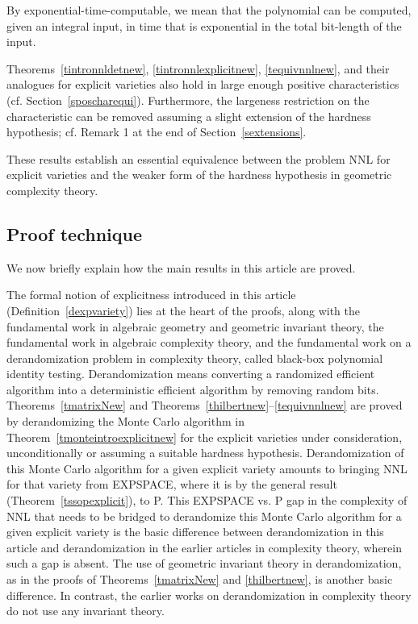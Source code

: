 \documentclass[11pt]{article}
\begin{document}
By exponential-time-computable, we mean that  the  polynomial can be computed, given an integral input, in
time  that is exponential in the total bit-length of the  input. 

Theorems~\ref{tintronnldetnew}, \ref{tintronnlexplicitnew},  \ref{tequivnnlnew}, and their analogues for
explicit varieties also  hold in large enough  positive characteristics (cf. Section~\ref{sposcharequi}). Furthermore, the largeness restriction on
the characteristic can be removed assuming a slight
extension of the hardness hypothesis; cf. Remark 1 at the end of Section~\ref{sextensions}.

These results establish an essential equivalence between
the problem NNL for explicit varieties and 
the weaker form of the hardness hypothesis \cite{GCT1} 
in geometric complexity
theory. 

\subsection{Proof technique} \label{sprooftech}
We now briefly explain how the main results in this article  are proved.

The formal notion of explicitness introduced in this article (Definition~\ref{dexpvariety}) lies 
at the heart of  the proofs, along with the fundamental work  
\cite{hilbert,mumford,popov,derksen,procesimatrix,razmyslov,formanek1,raghavan}
in algebraic geometry 
and geometric invariant theory, the fundamental work \cite{valiant2,skyum,strassen,kaltofen,kaltofenlec,kaltofen2,malod} in
algebraic complexity theory, and the fundamental work \cite{schnorr,nisan,impa,russell,amir,manindra,fs2,fs1}
on a   derandomization problem in complexity theory, called black-box polynomial identity testing.
Derandomization  means converting a randomized efficient
algorithm into a deterministic  efficient algorithm by removing random bits. 
Theorems~\ref{tmatrixNew} and Theorems~\ref{thilbertnew}--\ref{tequivnnlnew} are proved by derandomizing the 
Monte Carlo algorithm in Theorem~\ref{tmonteintroexplicitnew} for the explicit varieties under consideration,
unconditionally or assuming a suitable hardness hypothesis.
Derandomization of this Monte Carlo algorithm for a given explicit variety 
amounts to  bringing NNL for that variety from EXPSPACE, where it is 
by the general result (Theorem~\ref{tssopexplicit}), to P. 
This EXPSPACE vs. P gap  in the complexity of NNL that  needs to be bridged 
to derandomize this Monte Carlo algorithm for a given explicit variety is 
the basic  difference between derandomization in this article and derandomization in the earlier 
articles \cite{nisan,impa,russell,manindra,fs2,amir} in complexity theory, wherein such a  gap is absent.
The use of  geometric invariant theory \cite{mumford} in derandomization,
as in the proofs of Theorems~\ref{tmatrixNew} 
and \ref{thilbertnew},  is another basic  difference.
In contrast, the earlier works \cite{nisan,impa,russell,manindra,fs2,amir} on derandomization in complexity theory
do not use any    invariant theory. 
\end{document}
